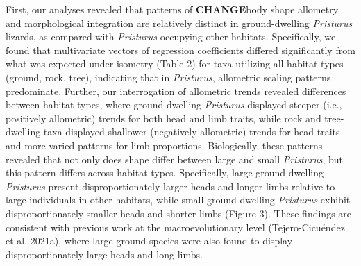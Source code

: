 \documentclass[
  11pt,
]{article}
\begin{document}
First, our analyses revealed that patterns of \textbf{CHANGE}body shape
allometry and morphological integration are relatively distinct in
ground-dwelling \emph{Pristurus} lizards, as compared with
\emph{Pristurus} occupying other habitats. Specifically, we found that
multivariate vectors of regression coefficients differed significantly
from what was expected under isometry (Table 2) for taxa utilizing all
habitat types (ground, rock, tree), indicating that in \emph{Pristurus},
allometric scaling patterns predominate. Further, our interrogation of
allometric trends revealed differences between habitat types, where
ground-dwelling \emph{Pristurus} displayed steeper (i.e., positively
allometric) trends for both head and limb traits, while rock and
tree-dwelling taxa displayed shallower (negatively allometric) trends
for head traits and more varied patterns for limb proportions.
Biologically, these patterns revealed that not only does shape differ
between large and small \emph{Pristurus}, but this pattern differs
across habitat types. Specifically, large ground-dwelling
\emph{Pristurus} present disproportionately larger heads and longer
limbs relative to large individuals in other habitats, while small
ground-dwelling \emph{Pristurus} exhibit disproportionately smaller
heads and shorter limbs (Figure 3). These findings are consistent with
previous work at the macroevolutionary level (Tejero-Cicuéndez et al.
2021a), where large ground species were also found to display
disproportionately large heads and long limbs. \hfill\break
\end{document}

